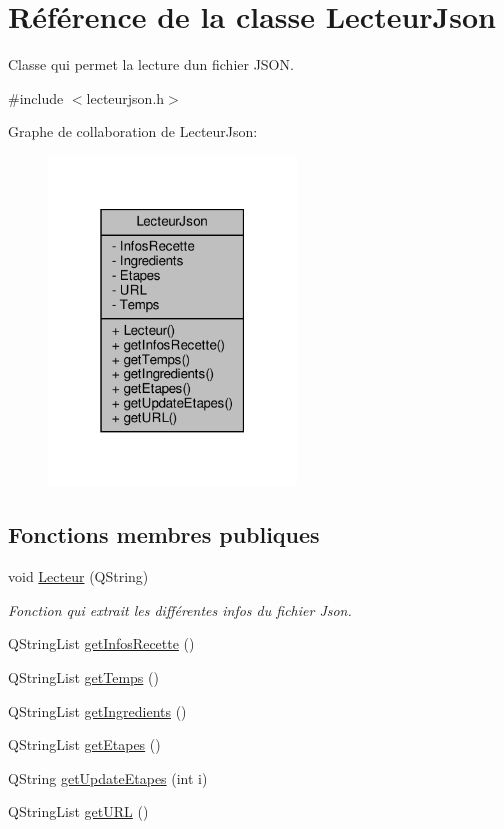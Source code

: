 \hypertarget{class_lecteur_json}{}\section{Référence de la classe Lecteur\+Json}
\label{class_lecteur_json}


Classe qui permet la lecture d\textquotesingle{}un fichier J\+S\+ON.  




{\ttfamily \#include $<$lecteurjson.\+h$>$}



Graphe de collaboration de Lecteur\+Json\+:
\nopagebreak
\begin{figure}[H]
\begin{center}
\leavevmode
\includegraphics[width=187pt]{class_lecteur_json__coll__graph}
\end{center}
\end{figure}
\subsection*{Fonctions membres publiques}
\begin{DoxyCompactItemize}
\item 
void \hyperlink{class_lecteur_json_a6b74dbecd8cb87168fb2d36bc1a22f2b}{Lecteur} (Q\+String)
\begin{DoxyCompactList}\small\item\em Fonction qui extrait les différentes infos du fichier Json. \end{DoxyCompactList}\item 
Q\+String\+List \hyperlink{class_lecteur_json_a0c507870050e16de3688d310d1f3b65a}{get\+Infos\+Recette} ()
\item 
Q\+String\+List \hyperlink{class_lecteur_json_a88d73523c1775a8c7001b5abae152740}{get\+Temps} ()
\item 
Q\+String\+List \hyperlink{class_lecteur_json_a0c18d502de54aea85b4d76f1b2858423}{get\+Ingredients} ()
\item 
Q\+String\+List \hyperlink{class_lecteur_json_ab698142bf586bb224c35962525ce3915}{get\+Etapes} ()
\item 
Q\+String \hyperlink{class_lecteur_json_ad3a86b8dc577d1e6d77a66b8ece8442a}{get\+Update\+Etapes} (int i)
\item 
Q\+String\+List \hyperlink{class_lecteur_json_a4ceacda970b2b838bb41211decdd799f}{get\+U\+RL} ()
\end{DoxyCompactItemize}
